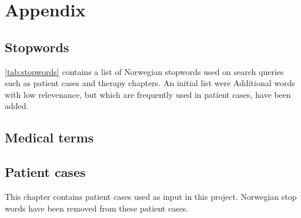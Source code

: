 \documentclass[11pt,a4paper]{report}
\begin{document}
\clearpage
{}








%


\appendix
\chapter{Appendix}
\label{appendix}


\section{Stopwords}
\autoref{tab:stopwords} contains a list of Norwegian stopwords used on search
queries such as patient cases and therapy chapters.
An initial list were %
Additional words with low relevenance, but which are frequently used in
patient cases, have been added.


\section{Medical terms}


\section{Patient cases}
This chapter contains patient cases used as input in this project.
Norwegian stop words have been removed from these patient cases.





\end{document}
